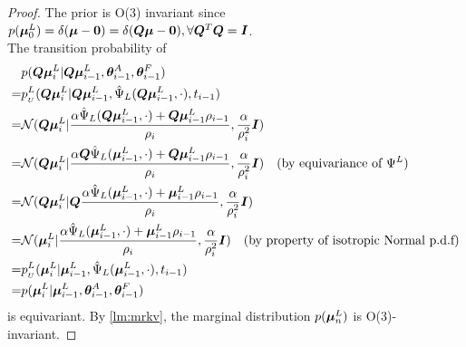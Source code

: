 \begin{proof}
    The prior is O(3) invariant since $p(\vmu^L_0)=\delta(\vmu-\Vec{0})=\delta(\vQ\vmu-\Vec{0}),\forall \vQ^T\vQ=\vI$.\\
    The transition probability of
    \begin{align*}
    &p({\bm{Q}}\bm{\mu}^L_{i}|{\bm{Q}}\bm{\mu}^L_{i-1},\boldsymbol{\theta}_{i-1}^A,\boldsymbol{\theta}_{i-1}^F)\\
    =&p_{_U}^L({\bm{Q}}\bm{\mu}^L_{i}|{\bm{Q}}\bm{\mu}^L_{i-1},\hat{\Psi}_L({\bm{Q}}\bm{\mu}^L_{i-1},\cdot),t_{i-1})\\
    =&\mathcal{N}({\bm{Q}}\bm{\mu}^L_{i}|\frac{\alpha\hat{\Psi}_L({\bm{Q}}\bm{\mu}^L_{i-1},\cdot)+{\bm{Q}}\bm{\mu}^L_{i-1}\rho_{i-1}}{\rho_{i}},\frac{\alpha}{\rho_i^2}{\bm{I}}) \\
    =&\mathcal{N}({\bm{Q}}\bm{\mu}^L_{i}|\frac{\alpha{\bm{Q}}\hat{\Psi}_L(\bm{\mu}^L_{i-1},\cdot)+{\bm{Q}}\bm{\mu}^L_{i-1}\rho_{i-1}}{\rho_{i}},\frac{\alpha}{\rho_i^2}{\bm{I}}) \quad (\text{by equivariance of }\Psi^L)\\
    =&\mathcal{N}({\bm{Q}}\bm{\mu}^L_{i}|{\bm{Q}}\frac{\alpha\hat{\Psi}_L(\bm{\mu}^L_{i-1},\cdot)+\bm{\mu}^L_{i-1}\rho_{i-1}}{\rho_{i}},\frac{\alpha}{\rho_i^2}{\bm{I}})\\
    =&\mathcal{N}(\bm{\mu}^L_{i}|\frac{\alpha\hat{\Psi}_L(\bm{\mu}^L_{i-1},\cdot)+\bm{\mu}^L_{i-1}\rho_{i-1}}{\rho_{i}},\frac{\alpha}{\rho_i^2}{\bm{I}})\quad (\text{by property of isotropic Normal p.d.f})\\
    =&p_{_U}^L(\bm{\mu}^L_{i}|\bm{\mu}^L_{i-1},\hat{\Psi}_L(\bm{\mu}^L_{i-1},\cdot),t_{i-1})\\
    =&p(\bm{\mu}^L_{i}|\bm{\mu}^L_{i-1},\boldsymbol{\theta}_{i-1}^A,\boldsymbol{\theta}_{i-1}^F)\\
    \end{align*}
    is equivariant. By \cref{lm:mrkv}, the marginal distribution $p(\bm{\mu}^L_n)$ is O(3)-invariant.
\end{proof}
\fracinv*
